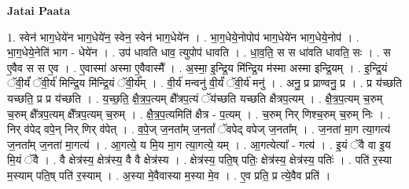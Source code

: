 \documentclass[17pt]{extarticle}
\begin{document}
\textbf{Jatai Paata} \newline

1. स्वेन॑ भाग॒धेये॑न भाग॒धेये॑न॒ स्वेन॒ स्वेन॑ भाग॒धेये॑न । . भा॒ग॒धेये॒नोपोप॑ भाग॒धेये॑न भाग॒धेये॒नोप॑ । . भा॒ग॒धेये॒नेति॑ भाग - धेये॑न । . उप॑ धावति धाव॒ त्युपोप॑ धावति । . धा॒व॒ति॒ स स धा॑वति धावति॒ सः । . स ए॒वैव स स ए॒व । . ए॒वास्मा॑ अस्मा ए॒वैवास्मै᳚ । . अ॒स्मा॒ इ॒न्द्रि॒य मि॑न्द्रि॒य म॑स्मा अस्मा इन्द्रि॒यम् । . इ॒न्द्रि॒यं ॅवी॒र्यं॑ ॅवी॒र्य॑ मिन्द्रि॒य मि॑न्द्रि॒यं ॅवी॒र्य᳚म् । . वी॒र्य॑ मन्वनु॑ वी॒र्यं॑ ॅवी॒र्य॑ मनु॑ । . अनु॒ प्र प्राण्वनु॒ प्र । . प्र य॑च्छति यच्छति॒ प्र प्र य॑च्छति । . य॒च्छ॒ति॒ क्षै॒त्र॒प॒त्यम् क्षै᳚त्रप॒त्यं ॅय॑च्छति यच्छति क्षैत्रप॒त्यम् । . क्षै॒त्र॒प॒त्यम् च॒रुम् च॒रुम् क्षै᳚त्रप॒त्यम् क्षै᳚त्रप॒त्यम् च॒रुम् । . क्षै॒त्र॒प॒त्यमिति॑ क्षैत्र - प॒त्यम् । . च॒रुम् निर् णिश्च॒रुम् च॒रुम् निः । . निर् व॑पेद् वपे॒न् निर् णिर् व॑पेत् । . व॒पे॒ज् ज॒नता᳚म् ज॒नतां᳚ ॅवपेद् वपेज् ज॒नता᳚म् । . ज॒नता॑ मा॒ग त्या॒गत्य॑ ज॒नता᳚म् ज॒नता॑ मा॒गत्य॑ । . आ॒गत्ये॒ य मि॒य मा॒ग त्या॒गत्ये॒ यम् । . आ॒गत्येत्या᳚ - गत्य॑ । . इ॒यं ॅवै वा इ॒य मि॒यं ॅवै । . वै क्षेत्र॑स्य॒ क्षेत्र॑स्य॒ वै वै क्षेत्र॑स्य । . क्षेत्र॑स्य॒ पति॒ष् पतिः॒ क्षेत्र॑स्य॒ क्षेत्र॑स्य॒ पतिः॑ । . पति॑ र॒स्या म॒स्याम् पति॒ष् पति॑ र॒स्याम् । . अ॒स्या मे॒वैवास्या म॒स्या मे॒व । . ए॒व प्रति॒ प्र त्ये॒वैव प्रति॑ । \newline
\end{document}
